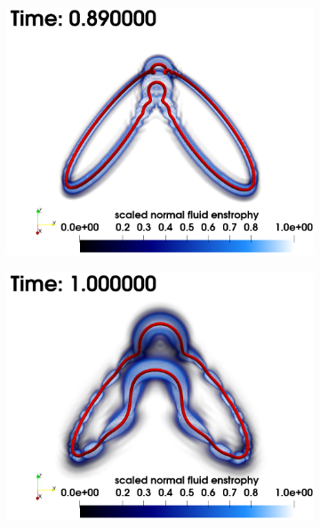 \documentclass[%
 reprint,
 amsmath,amssymb,
 aps,
 prl,
]{revtex4-2}
\begin{document}
\begin{figure}[t]
\begin{subfigure}[b]{0.24\textwidth}
		\includegraphics*[width=\textwidth]{snap-3.png}
	\end{subfigure}
    \begin{subfigure}[b]{0.24\textwidth}
		\centering
		\includegraphics*[width=\textwidth]{snap-4.png}
	\end{subfigure}
    \hfill
    \vspace{0.5cm}
	\begin{subfigure}[b]{0.24\textwidth}
		\centering

\end{subfigure}
\end{figure}
\end{document}
